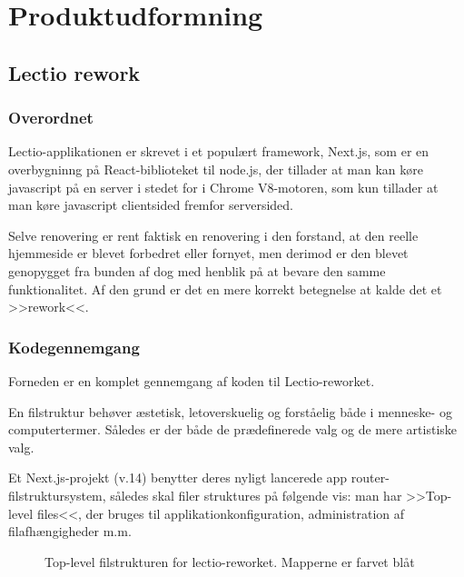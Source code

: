 \section{Produktudformning \label{sec:produktudformning}}
    \subsection{Lectio rework}
        \subsubsection{Overordnet}
           Lectio-applikationen er skrevet i et populært framework, Next.js, som er en overbygninng på React-biblioteket til node.js, der tillader at man kan køre javascript på en server i stedet for i Chrome V8-motoren, som kun tillader at man køre javascript clientsided fremfor serversided.

           Selve renovering er rent faktisk en renovering i den forstand, 
           at den reelle hjemmeside er blevet forbedret eller fornyet, 
           men derimod er den blevet genopygget fra bunden af dog med henblik på at bevare den samme funktionalitet. 
           Af den grund er det en mere korrekt betegnelse at kalde det et >>rework<<.
        \subsubsection{Kodegennemgang}
        Forneden er en komplet gennemgang af koden til Lectio-reworket.       

        En filstruktur behøver æstetisk, letoverskuelig og forståelig både i menneske- og computertermer.
        Således er der både de prædefinerede valg og de mere artistiske valg. 

        Et Next.js-projekt (v.14) benytter deres nyligt lancerede app router-filstruktursystem, således skal filer struktures på følgende vis: man har >>Top-level files<<, der bruges til applikationkonfiguration, administration af filafhængigheder m.m.\cite{projstruct}
        \begin{figure}[H]
        \caption{Top-level filstrukturen for lectio-reworket. Mapperne er farvet blåt}
        \label{fig:tlprojstruct}
        \end{figure}

